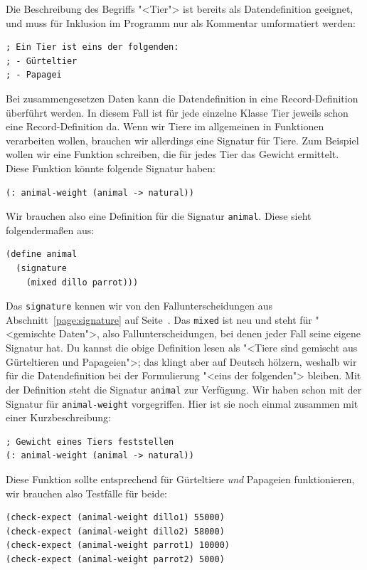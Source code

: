 Die Beschreibung des Begriffs "<Tier"> ist bereits als Datendefinition
geeignet, und muss für Inklusion im Programm nur als Kommentar
umformatiert werden:
%
\begin{lstlisting}
; Ein Tier ist eins der folgenden:
; - Gürteltier
; - Papagei
\end{lstlisting}
%
Bei zusammengesetzen Daten kann die Datendefinition in eine
Record-Definition überführt werden.  In diesem Fall ist für jede
einzelne Klasse
Tier jeweils schon eine Record-Definition da.  Wenn wir Tiere im
allgemeinen in
Funktionen verarbeiten wollen, brauchen wir allerdings eine Signatur
für Tiere.  Zum Beispiel wollen wir eine Funktion schreiben, die für jedes
Tier das Gewicht ermittelt.  Diese Funktion könnte folgende Signatur haben:
%
\begin{lstlisting}
(: animal-weight (animal -> natural))
\end{lstlisting}
Wir brauchen also eine Definition für die Signatur \lstinline{animal}.
Diese sieht folgendermaßen aus:
%
\begin{lstlisting}
(define animal
  (signature
    (mixed dillo parrot)))
\end{lstlisting}
%
Das \lstinline{signature} kennen wir von den Fallunterscheidungen aus
Abschnitt~\ref{page:signature} auf Seite~\pageref{page:signature}.
Das \lstinline{mixed} ist neu und steht
für "<gemischte Daten">, also Fallunterscheidungen, bei denen jeder
Fall seine eigene Signatur hat.  Du kannst die obige Definition lesen als
"<Tiere sind gemischt aus Gürteltieren und Papageien">; das klingt
aber auf Deutsch hölzern, weshalb wir für die Datendefinition bei der
Formulierung "<eins der folgenden"> bleiben.  Mit der Definition steht
die Signatur \lstinline{animal} zur Verfügung.  Wir haben schon mit der
Signatur für \lstinline{animal-weight} vorgegriffen.  Hier ist sie noch
einmal zusammen mit einer Kurzbeschreibung:
%
\begin{lstlisting}
; Gewicht eines Tiers feststellen
(: animal-weight (animal -> natural))
\end{lstlisting}
%
Diese Funktion sollte entsprechend für Gürteltiere \emph{und}
Papageien funktionieren, wir brauchen also Testfälle für beide:
%
\begin{lstlisting}
(check-expect (animal-weight dillo1) 55000)
(check-expect (animal-weight dillo2) 58000)
(check-expect (animal-weight parrot1) 10000)
(check-expect (animal-weight parrot2) 5000)
\end{lstlisting}
